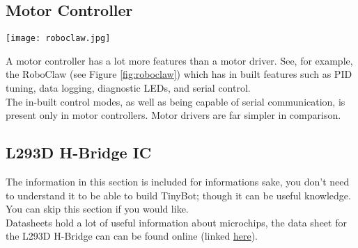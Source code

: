 \documentclass[../TinyBot.tex]{subfiles}
\begin{document}
\subsection{Motor Controller}

\begin{minipage}{0.3\textwidth}\vspace{0pt}
    \texttt{[image: roboclaw.jpg]}
    \label{fig:roboclaw}
\end{minipage}
\begin{minipage}{0.7\textwidth}\vspace{0pt}
    A motor controller has a lot more features than a motor driver. See, for example, the RoboClaw  (see Figure \ref{fig:roboclaw}) which has in built features such as PID tuning, data logging, diagnostic LEDs, and serial control. \\
    
    
    The in-built control modes, as well as being capable of serial communication, is present only in motor controllers. Motor drivers are far simpler in comparison. \\

\end{minipage}


\subsection{L293D H-Bridge IC}

The information in this section is included for informations sake, you don't need to understand it to be able to build TinyBot; though it can be useful knowledge. You can skip this section if you would like. \\



Datasheets hold a lot of useful information about microchips, the data sheet for the L293D H-Bridge can can be found online (linked \href{https://www.altronics.com.au/p/z2900-l293d-motor-drive-ic/}{here}).\\
\end{document}
